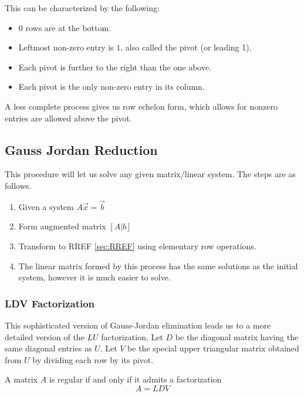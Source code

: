     This can be characterized by the following:

    \begin{itemize}
        \item $0$ rows are at the bottom.
        \item Leftmost non-zero entry is $1$, also called the pivot (or leading 1).
        \item Each pivot is further to the right than the one above.
        \item Each pivot is the only non-zero entry in its column.
    \end{itemize}

    A less complete process gives us row echelon form, which allows for nonzero entries are allowed above the pivot.

    \subsection{Gauss Jordan Reduction}
    This procedure will let us solve any given matrix/linear system. The steps are as follows.

    \begin{enumerate}
        \item Given a system $A\vec{x} = \vec{b}$
        \item Form augmented matrix $[A|b]$
        \item Transform to RREF \eqref{sec:RREF} using elementary row operations.
        \item The linear matrix formed by this process has the same solutions as the initial system, however it is much easier to solve.
    \end{enumerate}

        \subsubsection{LDV Factorization}
        This sophisticated version of Gauss-Jordan elimination leads us to a more detailed version of the $LU$ factorization. Let $D$ be the diagonal matrix having the same diagonal entries as $U$. Let $V$ be the special upper triangular matrix obtained from $U$ by dividing each row by its pivot.

        \begin{thm}
            A matrix $A$ is regular if and only if it admits a factorization
            \[
                A = LDV
            \]
        \end{thm}

